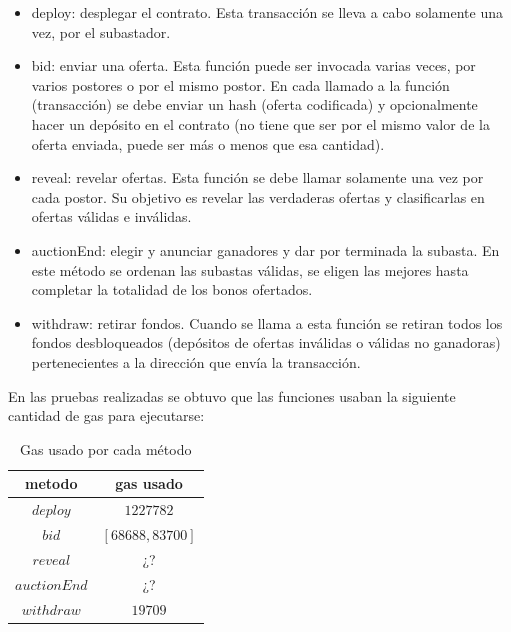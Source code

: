       \begin{itemize}
        \item deploy: desplegar el contrato. Esta transacción se lleva a cabo solamente una vez, por el 
        subastador.
        \item bid: enviar una oferta. Esta función puede ser invocada varias veces, por varios postores o por
        el mismo postor. En cada llamado a la función (transacción) se debe enviar un hash (oferta codificada)
        y opcionalmente hacer un depósito en el contrato (no tiene que ser por el mismo valor de la oferta enviada,
        puede ser más o menos que esa cantidad).
        \item reveal: revelar ofertas. Esta función se debe llamar solamente una vez por cada postor. Su
        objetivo es revelar las verdaderas ofertas y clasificarlas en ofertas válidas e inválidas.
        \item auctionEnd: elegir y anunciar ganadores y dar por terminada la subasta. En este método se
        ordenan las subastas válidas, se eligen las mejores hasta completar la totalidad de los bonos
        ofertados.
        \item withdraw: retirar fondos. Cuando se llama a esta función se retiran todos los fondos 
        desbloqueados (depósitos de ofertas inválidas o válidas no ganadoras) pertenecientes a la dirección 
        que envía la transacción.
      \end{itemize}

      En las pruebas realizadas se obtuvo que las funciones usaban la siguiente cantidad de gas para 
      ejecutarse:

      \begin{table}[h!]
        \centering
        \begin{tabular}{|c|c|} \hline
          metodo        & gas usado        \\ \hline
          $deploy$      & $1227782$        \\ \hline
          $bid$         & $[68688, 83700]$ \\ \hline
          $reveal$      & ¿?         \\ \hline
          $auctionEnd$  & ¿?         \\ \hline
          $withdraw$    & $19709$          \\ \hline
        \end{tabular}
        \caption{Gas usado por cada método}
        \label{gas_used}
      \end{table}



